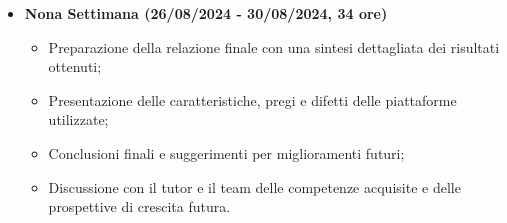 {\begin{itemize}
    \item \textbf{Nona Settimana (26/08/2024 - 30/08/2024, 34 ore)}
    \begin{itemize}
        \item Preparazione della relazione finale con una sintesi dettagliata dei risultati ottenuti;
        \item Presentazione delle caratteristiche, pregi e difetti delle piattaforme utilizzate;
        \item Conclusioni finali e suggerimenti per miglioramenti futuri;
        \item Discussione con il tutor e il team delle competenze acquisite e delle prospettive di crescita futura.
    \end{itemize}
\end{itemize}
}

\newcommand{\totaleOre}{306}

\newcommand{\obiettiviObbligatori}{
	 \item \underline{\textit{O01}}: Acquisire conoscenze di base su sistemi gestionali, database, machine learning, grafi e process mining;
	 \item \underline{\textit{O02}}: Approfondimento documentale delle piattaforme di Process Mining e Data Mining, con particolare attenzione a Celonis;
	 \item \underline{\textit{O03}}: Installazione, configurazione e comprensione dell'interfacciamento con la piattaforma Celonis;
	 \item \underline{\textit{O04}}: Estrarre e caricare dati dall'ERP aziendale o generati ad-hoc nelle piattaforme di Process Mining;
	 \item \underline{\textit{O05}}: Pulizia e trasformazione dei dati per adattarli ai requisiti delle piattaforme;
	 \item \underline{\textit{O06}}: Creare e affinare modelli di processo basati sui dati reali caricati nelle piattaforme;
	 \item \underline{\textit{O07}}: Analisi dei dati processati dalle piattaforme e interpretazione dei risultati con l'aiuto del tutor;
	 \item \underline{\textit{O08}}: Redigere una relazione finale con spiegazioni, osservazioni, pregi e difetti delle piattaforme utilizzate;
	 \item \underline{\textit{O09}}: Documentare i risultati ottenuti e proporre possibili sviluppi futuri basati sulle analisi effettuate;
}

